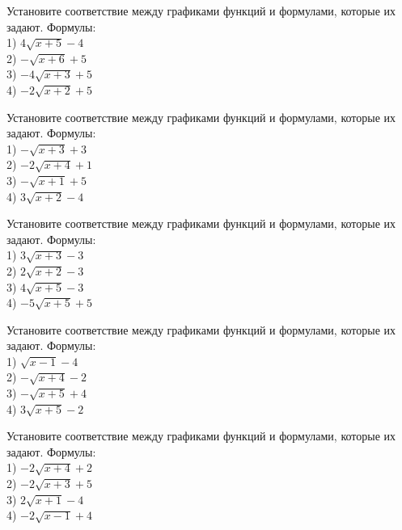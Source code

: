 \documentclass[4apaper]{article}
\begin{document}
\begin{taskBN}{31}
Установите соответствие между графиками функций и формулами, которые их задают. Формулы: \\1) $4\sqrt{x+5}-4$\\2) $-\sqrt{x+6}+5$\\3) $-4\sqrt{x+3}+5$\\4) $-2\sqrt{x+2}+5$
\end{taskBN}

\begin{taskBN}{32}
Установите соответствие между графиками функций и формулами, которые их задают. Формулы: \\1) $-\sqrt{x+3}+3$\\2) $-2\sqrt{x+4}+1$\\3) $-\sqrt{x+1}+5$\\4) $3\sqrt{x+2}-4$
\end{taskBN}

\begin{taskBN}{33}
Установите соответствие между графиками функций и формулами, которые их задают. Формулы: \\1) $3\sqrt{x+3}-3$\\2) $2\sqrt{x+2}-3$\\3) $4\sqrt{x+5}-3$\\4) $-5\sqrt{x+5}+5$
\end{taskBN}

\begin{taskBN}{34}
Установите соответствие между графиками функций и формулами, которые их задают. Формулы: \\1) $\sqrt{x-1}-4$\\2) $-\sqrt{x+4}-2$\\3) $-\sqrt{x+5}+4$\\4) $3\sqrt{x+5}-2$
\end{taskBN}

\begin{taskBN}{35}
Установите соответствие между графиками функций и формулами, которые их задают. Формулы: \\1) $-2\sqrt{x+4}+2$\\2) $-2\sqrt{x+3}+5$\\3) $2\sqrt{x+1}-4$\\4) $-2\sqrt{x-1}+4$
\end{taskBN}
\end{document}
